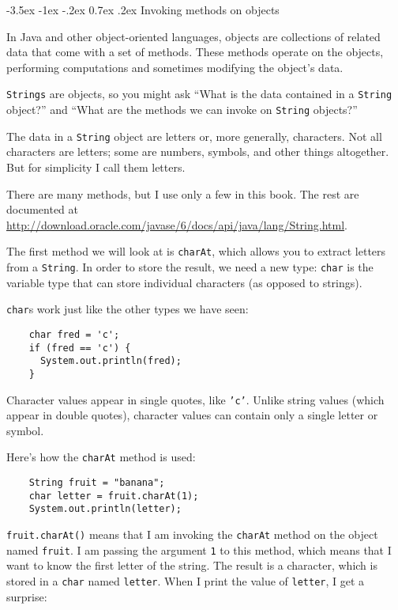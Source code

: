 \documentclass{book}
\makeatletter
\renewcommand{\section}{\@startsection 
    {section} {1} {0mm}%
    {-3.5ex \@plus -1ex \@minus -.2ex}%
    {0.7ex \@plus.2ex}%
    {\normalfont\Large\bfseries}}
\makeatother
\begin{document}
\section{Invoking methods on objects}

In Java and other object-oriented languages, objects are collections
of related data that come with a set of methods.  These methods
operate on the objects, performing computations and sometimes
modifying the object's data.

{\tt Strings} are objects,
so you might ask ``What is the data
contained in a {\tt String} object?'' and ``What are the methods we
can invoke on {\tt String} objects?''


The data in a {\tt String} object are letters or, more generally,
characters.  Not all characters are letters; some are numbers,
symbols, and other things altogether.  But for simplicity I
call them letters.

There are many methods, but I use only a few in this
book.  The rest are documented at
\url{http://download.oracle.com/javase/6/docs/api/java/lang/String.html}.

The first method we will look at is {\tt charAt}, which allows you to
extract letters from a {\tt String}.  In order to store the result, we
need a new type: {\tt char} is the variable type that can store
individual characters (as opposed to strings).


{\tt char}s work just like the other types we have seen:

\begin{verbatim}
    char fred = 'c';
    if (fred == 'c') {
      System.out.println(fred);
    }
\end{verbatim}
%
Character values appear in single quotes, like {\tt 'c'}.  Unlike
string values (which appear in double quotes), character values
can contain only a single letter or symbol.


Here's how the {\tt charAt} method is used:

\begin{verbatim}
    String fruit = "banana";
    char letter = fruit.charAt(1);
    System.out.println(letter);
\end{verbatim}
%
{\tt fruit.charAt()} means that I am 
invoking the {\tt charAt} method on the object named
{\tt fruit}.
I am passing the argument {\tt 1} to this method,
which means that I want to know the first letter of
the string.  The result is a character, which is stored in a
{\tt char} named {\tt letter}.  When I print the value of
{\tt letter}, I get a surprise:
\end{document}
